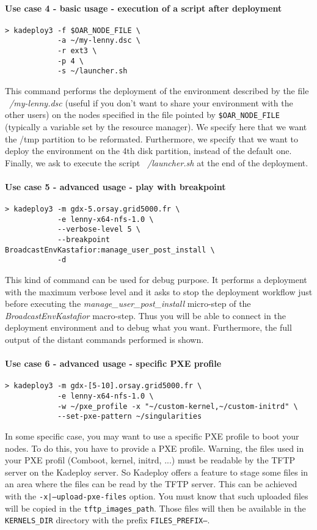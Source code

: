 \documentclass[a4wide,10pt,oneside]{book}
\begin{document}
\paragraph{Use case 4 - basic usage - execution of a script after deployment}
\begin{verbatim}
> kadeploy3 -f $OAR_NODE_FILE \
            -a ~/my-lenny.dsc \
            -r ext3 \
            -p 4 \
            -s ~/launcher.sh
\end{verbatim}
This command performs the deployment of the environment described by the file \textit{~/my-lenny.dsc} (useful if you don't want to share your environment with the other users) on the nodes specified in the file pointed by \texttt{\$OAR\_NODE\_FILE} (typically a variable set by the resource manager). We specify here that we want the /tmp partition to be reformated. Furthermore, we specify that we want to deploy the environment on the 4th disk partition, instead of the default one. Finally, we ask to execute the script \textit{~/launcher.sh} at the end of the deployment.

\paragraph{Use case 5 - advanced usage - play with breakpoint}
\begin{verbatim}
> kadeploy3 -m gdx-5.orsay.grid5000.fr \
            -e lenny-x64-nfs-1.0 \
            --verbose-level 5 \
            --breakpoint BroadcastEnvKastafior:manage_user_post_install \
            -d
\end{verbatim}
This kind of command can be used for debug purpose. It performs a deployment with the maximum verbose level and it asks to stop the deployment workflow just before executing the \textit{manage\_user\_post\_install} micro-step of the \textit{BroadcastEnvKastafior} macro-step. Thus you will be able to connect in the deployment environment and to debug what you want. Furthermore, the full output of the distant commands performed is shown.

\paragraph{Use case 6 - advanced usage - specific PXE profile}
\begin{verbatim}
> kadeploy3 -m gdx-[5-10].orsay.grid5000.fr \
            -e lenny-x64-nfs-1.0 \
            -w ~/pxe_profile -x "~/custom-kernel,~/custom-initrd" \
            --set-pxe-pattern ~/singularities
\end{verbatim}
In some specific case, you may want to use a specific PXE profile to boot your nodes. To do this, you have to provide a PXE profile. Warning, the files used in your PXE profil (Comboot, kernel, initrd, ...) must be readable by the TFTP server on the Kadeploy server. So Kadeploy offers a feature to stage some files in an area where the files can be read by the TFTP server. This can be achieved with the \texttt{-x|--upload-pxe-files} option. You must know that such uploaded files will be copied in the \texttt{tftp\_images\_path}. Those files will then be available in the \texttt{KERNELS\_DIR} directory with the prefix \texttt{FILES\_PREFIX--}.
\end{document}
